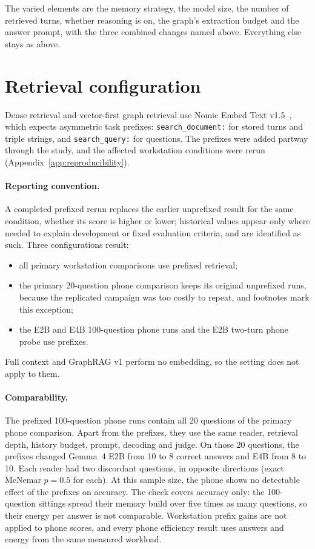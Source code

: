 The varied elements are the memory strategy, the model size, the number of retrieved turns, whether
reasoning is on, the graph's extraction budget and the answer prompt, with the three combined changes
named above. Everything else stays as above.

\section{Retrieval configuration}
\label{sec:retrieval}

Dense retrieval and vector-first graph retrieval use Nomic Embed Text
v1.5~\citep{nomic_embed,nomic_embed_card}, which expects asymmetric task prefixes:
\texttt{search\_document:} for stored turns and triple strings, and \texttt{search\_query:} for
questions. The prefixes were added partway through the study, and the affected workstation
conditions were rerun (Appendix~\ref{app:reproducibility}).

\paragraph{Reporting convention.} A completed prefixed rerun replaces the earlier unprefixed result
for the same condition, whether its score is higher or lower; historical values appear only where
needed to explain development or fixed evaluation criteria, and are identified as such. Three
configurations result:
\begin{itemize}
  \item all primary workstation comparisons use prefixed retrieval;
  \item the primary 20-question phone comparison keeps its original unprefixed runs, because the
        replicated campaign was too costly to repeat, and footnotes mark this exception;
  \item the E2B and E4B 100-question phone runs and the E2B two-turn phone probe use prefixes.
\end{itemize}
Full context and GraphRAG v1 perform no embedding, so the setting does not apply to them.

\paragraph{Comparability.} The prefixed 100-question phone runs contain all 20 questions of the
primary phone comparison. Apart from the prefixes, they use the same reader, retrieval depth,
history budget, prompt, decoding and judge. On those 20 questions, the prefixes changed Gemma~4 E2B
from 10 to 8 correct answers and E4B from 8 to 10. Each reader had two discordant questions, in
opposite directions (exact McNemar $p=0.5$ for each). At this sample size, the phone shows no
detectable effect of the prefixes on accuracy. The check covers accuracy only: the 100-question
sittings spread their memory build over five times as many questions, so their energy per answer is
not comparable. Workstation prefix gains are not applied to phone scores, and every phone
efficiency result uses answers and energy from the same measured workload.

